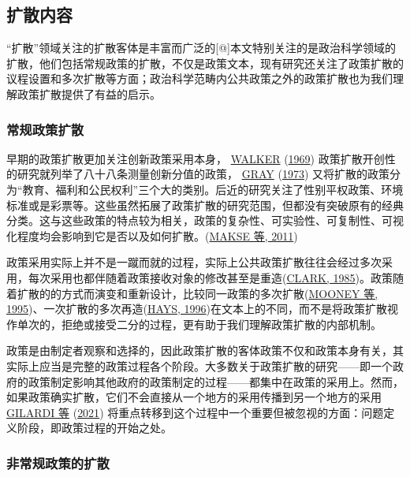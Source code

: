 \documentclass[
  12pt,
]{ctexart}
\begin{document}
\hypertarget{ux6269ux6563ux5185ux5bb9}{%
\subsection{扩散内容}\label{ux6269ux6563ux5185ux5bb9}}

``扩散''领域关注的扩散客体是丰富而广泛的{[}@{]}本文特别关注的是政治科学领域的扩散，他们包括常规政策的扩散，不仅是政策文本，现有研究还关注了政策扩散的议程设置和多次扩散等方面；政治科学范畴内公共政策之外的政策扩散也为我们理解政策扩散提供了有益的启示。

\hypertarget{ux5e38ux89c4ux653fux7b56ux6269ux6563}{%
\subsubsection{常规政策扩散}\label{ux5e38ux89c4ux653fux7b56ux6269ux6563}}

早期的政策扩散更加关注创新政策采用本身， \protect\hyperlink{ref-Walker1969}{WALKER} (\protect\hyperlink{ref-Walker1969}{1969}) 政策扩散开创性的研究就列举了八十八条测量创新分值的政策， \protect\hyperlink{ref-Gray1973}{GRAY} (\protect\hyperlink{ref-Gray1973}{1973}) 又将扩散的政策分为``教育、福利和公民权利''三个大的类别。后近的研究关注了性别平权政策、环境标准或是彩票等。这些虽然拓展了政策扩散的研究范围，但都没有突破原有的经典分类。这与这些政策的特点较为相关，政策的复杂性、可实验性、可复制性、可视化程度均会影响到它是否以及如何扩散。(\protect\hyperlink{ref-MakseVolden2011}{MAKSE 等, 2011})

政策采用实际上并不是一蹴而就的过程，实际上公共政策扩散往往会经过多次采用，每次采用也都伴随着政策接收对象的修改甚至是重造(\protect\hyperlink{ref-Clark1985}{CLARK, 1985})。政策随着扩散的的方式而演变和重新设计，比较同一政策的多次扩散(\protect\hyperlink{ref-MooneyLee1995}{MOONEY 等, 1995})、一次扩散的多次再造(\protect\hyperlink{ref-Hays1996}{HAYS, 1996})在文本上的不同，而不是将政策扩散视作单次的，拒绝或接受二分的过程，更有助于我们理解政策扩散的内部机制。

政策是由制定者观察和选择的，因此政策扩散的客体政策不仅和政策本身有关，其实际上应当是完整的政策过程各个阶段。大多数关于政策扩散的研究------即一个政府的政策制定影响其他政府的政策制定的过程------都集中在政策的采用上。然而，如果政策确实扩散，它们不会直接从一个地方的采用传播到另一个地方的采用 \protect\hyperlink{ref-GilardiEtAl2021}{GILARDI 等} (\protect\hyperlink{ref-GilardiEtAl2021}{2021}) 将重点转移到这个过程中一个重要但被忽视的方面：问题定义阶段，即政策过程的开始之处。

\hypertarget{ux975eux5e38ux89c4ux653fux7b56ux7684ux6269ux6563}{%
\subsubsection{非常规政策的扩散}\label{ux975eux5e38ux89c4ux653fux7b56ux7684ux6269ux6563}}
\end{document}
